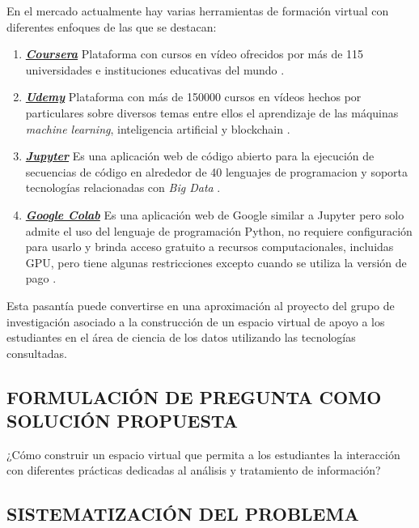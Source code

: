 \noindent
En el mercado actualmente hay varias herramientas de formaci\'on virtual con diferentes enfoques de las que se destacan:

\begin{enumerate}
	\item \textbf{\textit{\href{https://www.coursera.org}{Coursera}}} Plataforma con cursos en v\'ideo ofrecidos por m\'as de 115 universidades e instituciones educativas del mundo \cite{Coursera}.
	\item \textbf{\textit{\href{https://www.udemy.com}{Udemy}}} Plataforma con más de 150000 cursos en v\'ideos hechos por particulares sobre diversos temas entre ellos el aprendizaje de las máquinas \textit{machine learning}, inteligencia artificial y blockchain \cite{Udemy}. 
	\item \textbf{\textit{\href{https://jupyter.org}{Jupyter}}} Es una aplicaci\'on web de c\'odigo abierto para la ejecuci\'on de secuencias de c\'odigo en alrededor de 40 lenguajes de programacion y soporta  tecnolog\'ias relacionadas con \textit{Big Data} \cite{Jupyter}.
	\item \textbf{\textit{\href{https://colab.research.google.com/notebooks/intro.ipynb}{Google Colab}}} Es una aplicaci\'on web de Google similar a Jupyter pero solo admite el uso del lenguaje de programaci\'on Python, no requiere configuración para usarlo y brinda acceso gratuito a recursos computacionales, incluidas GPU, pero tiene algunas restricciones excepto cuando se utiliza la versi\'on de pago \cite{GoogleColab}.
\end{enumerate}

\noindent
Esta pasant\'ia puede convertirse en una aproximaci\'on al proyecto del grupo de investigaci\'on asociado a la construcci\'on de un espacio virtual de apoyo a los estudiantes en el \'area de ciencia de los datos utilizando las tecnolog\'ias consultadas.

\subsection{FORMULACIÓN DE PREGUNTA COMO SOLUCIÓN PROPUESTA}

\noindent ¿C\'omo construir un espacio virtual que permita a los estudiantes la interacci\'on con diferentes pr\'acticas dedicadas al an\'alisis y tratamiento de informaci\'on?

\subsection{SISTEMATIZACI\'ON DEL PROBLEMA}

